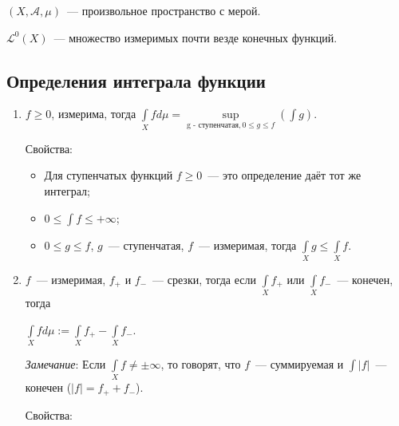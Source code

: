 \documentclass{article}
\begin{document}
    $(X, \mathcal{A}, \mu)$~--- произвольное пространство с мерой.
    
    $\mathcal{L}^0 (X)$~--- множество измеримых почти везде конечных функций.
    
    \subsection{Определения интеграла функции}
    
        \begin{enumerate}
        
                
            \item $f \geqslant 0$, измерима, тогда $\int\limits_{X} f d \mu = \sup\limits_{\text{g - ступенчатая}, 0 \leqslant g \leqslant f} \left( \int g \right)$.
            
                Свойства:
                
                \begin{itemize}
                
                    \item Для ступенчатых функций $f \geqslant 0$~--- это определение даёт тот же интеграл;
                    
                    \item $0 \leqslant \int f \leqslant +\infty$;
                    
                    \item $0 \leqslant g \leqslant f$, $g$~--- ступенчатая, $f$~--- измеримая, тогда $\int\limits_{X} g \leqslant \int\limits_{X} f$.
                    
                \end{itemize}
                
            \item $f$~--- измеримая, $f_+$ и $f_-$~--- срезки, тогда если $\int\limits_{X} f_+$ или $\int\limits_{X} f_-$~--- конечен, тогда 
            
                $\int\limits_{X} f d \mu := \int\limits_{X} f_+ - \int\limits_{X} f_-$. 
                
                \textit{Замечание}: Если $\int\limits_{X} f \neq \pm \infty$, то говорят, что $f$~--- суммируемая и $\int |f|$~--- конечен ($|f| = f_+ + f_-$).
                
                Свойства:
                
                \begin{itemize}
                

\end{itemize}
\end{enumerate}
\end{document}

